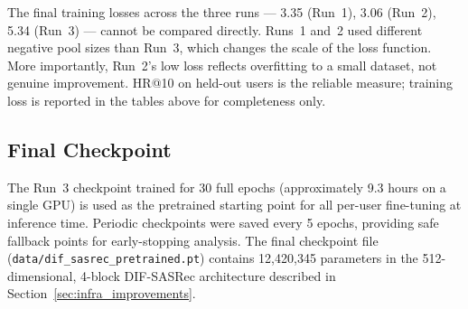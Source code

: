 The final training losses across the three runs — 3.35 (Run~1), 3.06 (Run~2), 5.34 (Run~3) — cannot be compared directly.
Runs~1 and~2 used different negative pool sizes than Run~3, which changes the scale of the loss function.
More importantly, Run~2's low loss reflects overfitting to a small dataset, not genuine improvement.
HR@10 on held-out users is the reliable measure; training loss is reported in the tables above for completeness only.

\subsection{Final Checkpoint}

The Run~3 checkpoint trained for 30 full epochs (approximately 9.3 hours on a single GPU) is used as the pretrained starting point for all per-user fine-tuning at inference time.
Periodic checkpoints were saved every 5 epochs, providing safe fallback points for early-stopping analysis.
The final checkpoint file (\texttt{data/dif\_sasrec\_pretrained.pt}) contains 12{,}420{,}345 parameters in the 512-dimensional, 4-block DIF-SASRec architecture described in Section~\ref{sec:infra_improvements}.
